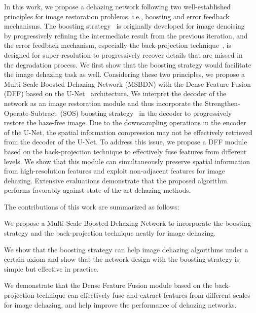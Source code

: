 \documentclass[10pt,twocolumn,letterpaper]{article}
\begin{document}
  In this work, we propose a dehazing network following two well-established principles for image restoration problems, i.e., boosting and error feedback mechanisms.
The boosting strategy~\cite{DiffusionBoosting, TwicingBoosting, SOS} is originally developed for image denoising by progressively refining the intermediate result from the previous iteration, and the error feedback mechanism, especially the back-projection technique~\cite{Irani1991,BiBP,DBPN}, is designed for super-resolution to progressively recover details that are missed in the degradation process.
We first show that the boosting strategy would facilitate the image dehazing task as well.
Considering these two principles, we propose a Multi-Scale Boosted Dehazing Network (MSBDN) with the Dense Feature Fusion (DFF) based on the U-Net~\cite{UNet,PFFNet} architecture.
We interpret the decoder of the network as an image restoration module and thus incorporate the Strengthen-Operate-Subtract~(SOS) boosting strategy~\cite{SOS} in the decoder to progressively restore the haze-free image.
Due to the downsampling operations in the encoder of the U-Net,
  the spatial information compression may not be effectively retrieved from the decoder of the U-Net.
To address this issue, we propose a DFF module based on the back-projection technique to effectively fuse features from different levels.
We show that this module can simultaneously preserve spatial information from high-resolution features and exploit non-adjacent features for image dehazing.
Extensive evaluations demonstrate that the proposed algorithm performs favorably against state-of-the-art dehazing methods.
  


\vspace{1pt}
  The contributions of this work are summarized as follows:
  \begin{compactitem}
\item We propose a Multi-Scale Boosted Dehazing Network to incorporate the boosting strategy and the back-projection technique neatly for image dehazing.
\item We show that the boosting strategy can help image dehazing algorithms under a certain axiom and show that the network design with the boosting strategy is simple but effective in practice.
  \item We demonstrate that the Dense Feature Fusion module based on the back-projection technique can effectively fuse and extract features from different scales for image dehazing, and help improve the performance of dehazing networks.
\end{compactitem}
\end{document}
